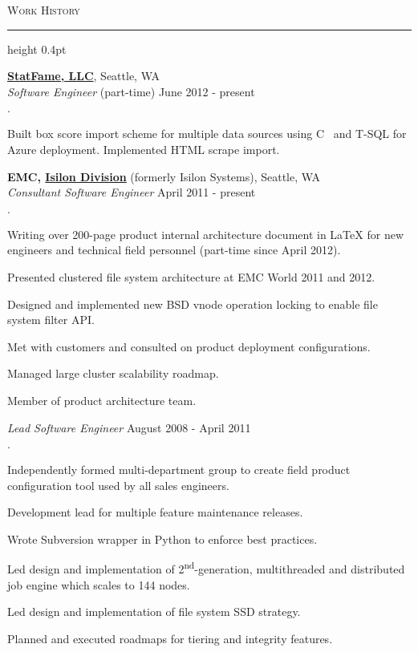 \documentclass[10pt]{article}
\newcommand{\myline}{\par
  \kern3pt %
  \hrule height 0.4pt
  \kern3pt %
}
\newcommand{\header}[1]{\textsc{\large #1} \myline}
\newenvironment{achievements}{\begin{list}{\bf \Large $\cdot$}{\topsep 2pt \itemsep 0pt}}{\vspace*{4pt}\end{list}}
\DeclareRobustCommand{\csharplogo}{\hbox{C\hspace{-0.5ex}
    \protect\raisebox{0.5ex}
    {\protect\scalebox{0.67}{\#}}}}
\begin{document}
\smallskip

\header{Work History}


\href{http://www.statfame.com}{\bf StatFame, LLC}, Seattle, WA \\
{\em Software Engineer} (part-time) \hfill June 2012 - present
\begin{achievements}
\item Built box score import scheme for multiple data sources using
  \csharplogo{} and T-SQL for Azure deployment.  Implemented HTML scrape import.
\end{achievements}

{\bf EMC, \href{http://www.isilon.com}{Isilon Division}} (formerly Isilon Systems), Seattle, WA \\
  {\em Consultant Software Engineer} \hfill April 2011 - present
  \begin{achievements}
  \item Writing over 200-page product internal architecture document in
    \LaTeX{} for new engineers and technical field personnel (part-time since
    April 2012).
  \item Presented clustered file system architecture at EMC World 2011 and 2012.
  \item Designed and implemented new BSD vnode operation locking to enable
    file system filter API.
  \item Met with customers and consulted on product deployment configurations.
  \item Managed large cluster scalability roadmap.
  \item Member of product architecture team.
  \end{achievements}

  {\em Lead Software Engineer} \hfill August 2008 - April 2011
  \begin{achievements}
  \item Independently formed multi-department group to create field product
    configuration tool used by all sales engineers.
  \item Development lead for multiple feature maintenance releases.
  \item Wrote Subversion wrapper in Python to enforce best practices.
  \item Led design and implementation of 2\textsuperscript{nd}-generation, multithreaded
    and distributed job engine which scales to 144 nodes.
  \item Led design and implementation of file system SSD strategy.
  \item Planned and executed roadmaps for tiering and integrity features.
  \end{achievements}
\end{document}
